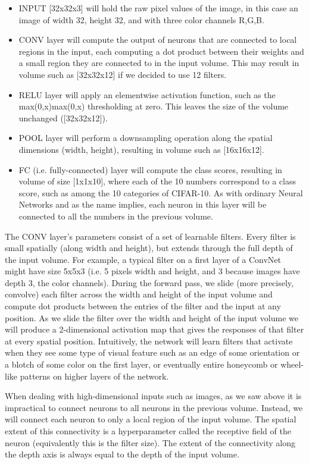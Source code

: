 \documentclass[11pt]{article}
\begin{document}
\begin{itemize}
    \item INPUT [32x32x3] will hold the raw pixel values of the image, in this case an image of width 32, height 32, and with three color channels R,G,B.
    \item CONV layer will compute the output of neurons that are connected to local regions in the input, each computing a dot product between their weights and a small region they are connected to in the input volume. This may result in volume such as [32x32x12] if we decided to use 12 filters.
    \item RELU layer will apply an elementwise activation function, such as the max(0,x)max(0,x) thresholding at zero. This leaves the size of the volume unchanged ([32x32x12]).
    \item POOL layer will perform a downsampling operation along the spatial dimensions (width, height), resulting in volume such as [16x16x12].
    \item FC (i.e. fully-connected) layer will compute the class scores, resulting in volume of size [1x1x10], where each of the 10 numbers correspond to a class score, such as among the 10 categories of CIFAR-10. As with ordinary Neural Networks and as the name implies, each neuron in this layer will be connected to all the numbers in the previous volume.
\end{itemize}

 The CONV layer’s parameters consist of a set of learnable filters. Every filter is small spatially (along width and height), but extends through the full depth of the input volume. For example, a typical filter on a first layer of a ConvNet might have size 5x5x3 (i.e. 5 pixels width and height, and 3 because images have depth 3, the color channels). During the forward pass, we slide (more precisely, convolve) each filter across the width and height of the input volume and compute dot products between the entries of the filter and the input at any position. As we slide the filter over the width and height of the input volume we will produce a 2-dimensional activation map that gives the responses of that filter at every spatial position. Intuitively, the network will learn filters that activate when they see some type of visual feature such as an edge of some orientation or a blotch of some color on the first layer, or eventually entire honeycomb or wheel-like patterns on higher layers of the network.

 When dealing with high-dimensional inputs such as images, as we saw above it is impractical to connect neurons to all neurons in the previous volume. Instead, we will connect each neuron to only a local region of the input volume. The spatial extent of this connectivity is a hyperparameter called the receptive field of the neuron (equivalently this is the filter size). The extent of the connectivity along the depth axis is always equal to the depth of the input volume.


\newpage

% 

\end{document}
